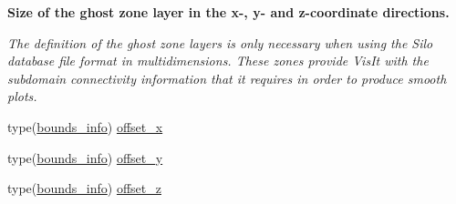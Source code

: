\begin{Indent}\textbf{ Size of the ghost zone layer in the x-\/, y-\/ and z-\/coordinate directions.}\par
{\em The definition of the ghost zone layers is only necessary when using the Silo database file format in multidimensions. These zones provide Vis\+It with the subdomain connectivity information that it requires in order to produce smooth plots. }\begin{DoxyCompactItemize}
\item 
type(\hyperlink{structm__derived__types_1_1bounds__info}{bounds\+\_\+info}) \hyperlink{namespacem__global__parameters_a5f209d71bd815d863485787639d9684a}{offset\+\_\+x}
\item 
type(\hyperlink{structm__derived__types_1_1bounds__info}{bounds\+\_\+info}) \hyperlink{namespacem__global__parameters_a576bd60474fdaccd3ee42edaaabddefa}{offset\+\_\+y}
\item 
type(\hyperlink{structm__derived__types_1_1bounds__info}{bounds\+\_\+info}) \hyperlink{namespacem__global__parameters_aacf46ffa4ec2f27743a20fb3016f2c82}{offset\+\_\+z}
\end{DoxyCompactItemize}
\end{Indent}
